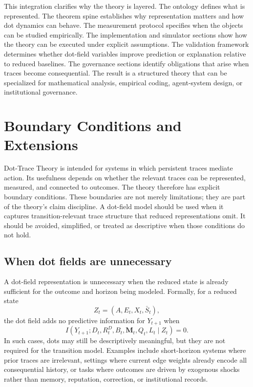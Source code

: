 \documentclass[11pt]{article}
\theoremstyle{remark}
\begin{document}
This integration clarifies why the theory is layered. The ontology defines what is represented. The theorem spine establishes why representation matters and how dot dynamics can behave. The measurement protocol specifies when the objects can be studied empirically. The implementation and simulator sections show how the theory can be executed under explicit assumptions. The validation framework determines whether dot-field variables improve prediction or explanation relative to reduced baselines. The governance sections identify obligations that arise when traces become consequential. The result is a structured theory that can be specialized for mathematical analysis, empirical coding, agent-system design, or institutional governance.

\section{Boundary Conditions and Extensions}\label{boundary-conditions-extensions}

Dot-Trace Theory is intended for systems in which persistent traces mediate action. Its usefulness depends on whether the relevant traces can be represented, measured, and connected to outcomes. The theory therefore has explicit boundary conditions. These boundaries are not merely limitations; they are part of the theory's claim discipline. A dot-field model should be used when it captures transition-relevant trace structure that reduced representations omit. It should be avoided, simplified, or treated as descriptive when those conditions do not hold.

\subsection{When dot fields are unnecessary}\label{boundary-memoryless-sufficient-state}

A dot-field representation is unnecessary when the reduced state is already sufficient for the outcome and horizon being modeled. Formally, for a reduced state
\[
Z_t=(A,E_t,X_t,\bar S_t),
\]
the dot field adds no predictive information for $Y_{t+1}$ when
\[
I(Y_{t+1};D_t,R_t^D,B_t,\mathbf M_t,Q_t,L_t\mid Z_t)=0.
\]
In such cases, dots may still be descriptively meaningful, but they are not required for the transition model. Examples include short-horizon systems where prior traces are irrelevant, settings where current edge weights already encode all consequential history, or tasks where outcomes are driven by exogenous shocks rather than memory, reputation, correction, or institutional records.
\end{document}
